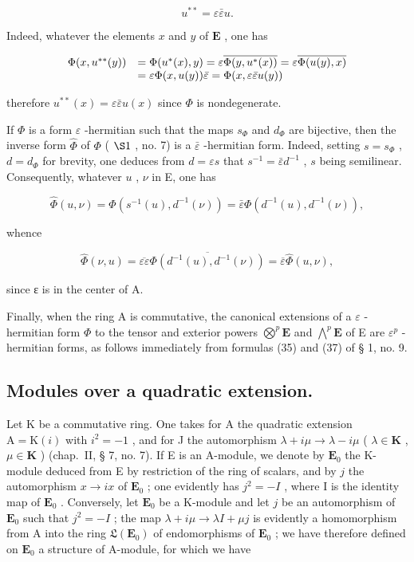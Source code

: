 \[
u ^ {* *} = \varepsilon \bar {\varepsilon} u.\tag{1}
\]

Indeed, whatever the elements \(x\) and \(y\) of \(\mathbf{E}\) , one has

\[
\begin{array}{r l} \Phi (x, u ^ {* *} (y)) & = \Phi (u ^ {*} (x), y) = \varepsilon \overline {{\Phi (y , u ^ {*} (x))}} = \varepsilon \overline {{\Phi (u (y) , x)}} \\ & = \varepsilon \Phi (x, u (y)) \bar {\varepsilon} = \Phi (x, \varepsilon \bar {\varepsilon} u (y)) \end{array}
\]

therefore \(u^{**}(x) = \varepsilon \bar{\varepsilon} u(x)\) since \(\Phi\) is nondegenerate.

If \(\Phi\) is a form \(\varepsilon\) -hermitian such that the maps \(s_{\Phi}\) and \(d_{\Phi}\) are bijective, then the inverse form \(\hat{\Phi}\) of \(\Phi\) ( \(\S 1\) , no. 7) is a \(\bar{\varepsilon}\) -hermitian form. Indeed, setting \(s = s_{\Phi}\) , \(d = d_{\Phi}\) for brevity, one deduces from \(d = \varepsilon s\) that \(s^{-1} = \bar{\varepsilon} d^{-1}\) , \(s\) being semilinear. Consequently, whatever \(u\) , \(\nu\) in E, one has

\[
\hat {\Phi} (u, \nu) = \Phi (s ^ {- 1} (u), d ^ {- 1} (\nu)) = \bar {\varepsilon} \Phi (d ^ {- 1} (u), d ^ {- 1} (\nu)),
\]

whence

\[
\widehat {\Phi} (\nu , u) = \overline {{\varepsilon \varepsilon}} \overline {{\Phi (d ^ {- 1} (u) , d ^ {- 1} (\nu))}} = \overline {{\varepsilon}} \widehat {\Phi} (u, \nu),
\]

since ε is in the center of A.

Finally, when the ring A is commutative, the canonical extensions of a \(\varepsilon\) -hermitian form \(\Phi\) to the tensor and exterior powers \(\bigotimes^{p}\mathbf{E}\) and \(\bigwedge^{p}\mathbf{E}\) of E are \(\varepsilon^{p}\) -hermitian forms, as follows immediately from formulas (35) and (37) of § 1, no. 9.

\subsection{Modules over a quadratic extension.}

Let K be a commutative ring. One takes for A the quadratic extension \(\mathrm{A} = \mathrm{K}(i)\) with \(i^{2} = -1\) , and for J the automorphism \(\lambda + i\mu \to \lambda - i\mu\) ( \(\lambda \in \mathbf{K}\) , \(\mu \in \mathbf{K}\) ) (chap.~II, § 7, no. 7). If E is an A-module, we denote by \(\mathbf{E}_0\) the K-module deduced from E by restriction of the ring of scalars, and by \(j\) the automorphism \(x \to ix\) of \(\mathbf{E}_0\) ; one evidently has \(j^2 = -I\) , where I is the identity map of \(\mathbf{E}_0\) . Conversely, let \(\mathbf{E}_0\) be a K-module and let \(j\) be an automorphism of \(\mathbf{E}_0\) such that \(j^2 = -I\) ; the map \(\lambda + i\mu \to \lambda I + \mu j\) is evidently a homomorphism from A into the ring \(\mathfrak{L}(\mathbf{E}_0)\) of endomorphisms of \(\mathbf{E}_0\) ; we have therefore defined on \(\mathbf{E}_0\) a structure of A-module, for which we have

